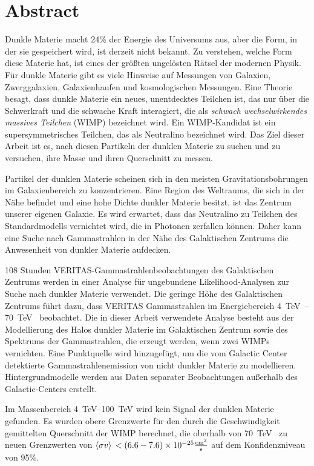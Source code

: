 \cleartooddpage[\thispagestyle{empty}]
\section*{Abstract}

Dunkle Materie macht 24\% der Energie des Universums aus, aber die Form, in der sie gespeichert wird, ist derzeit nicht bekannt.
Zu verstehen, welche Form diese Materie hat, ist eines der größten ungelösten Rätsel der modernen Physik.
Für dunkle Materie gibt es viele Hinweise auf Messungen von Galaxien, Zwerggalaxien, Galaxienhaufen und kosmologischen Messungen.
Eine Theorie besagt, dass dunkle Materie ein neues, unentdecktes Teilchen ist, das nur über die Schwerkraft und die schwache Kraft interagiert, die als \textit{schwach wechselwirkendes massives Teilchen} (WIMP) bezeichnet wird.
Ein WIMP-Kandidat ist ein supersymmetrisches Teilchen, das als Neutralino bezeichnet wird.
Das Ziel dieser Arbeit ist es, nach diesen Partikeln der dunklen Materie zu suchen und zu versuchen, ihre Masse und ihren Querschnitt zu messen.

Partikel der dunklen Materie scheinen sich in den meisten Gravitationsbohrungen im Galaxienbereich zu konzentrieren.
Eine Region des Weltraums, die sich in der Nähe befindet und eine hohe Dichte dunkler Materie besitzt, ist das Zentrum unserer eigenen Galaxie.
Es wird erwartet, dass das Neutralino zu Teilchen des Standardmodells vernichtet wird, die in Photonen zerfallen können.
Daher kann eine Suche nach Gammastrahlen in der Nähe des Galaktischen Zentrums die Anwesenheit von dunkler Materie aufdecken.

108 Stunden VERITAS-Gammastrahlenbeobachtungen des Galaktischen Zentrums werden in einer Analyse für ungebundene Likelihood-Analysen zur Suche nach dunkler Materie verwendet.
Die geringe Höhe des Galaktischen Zentrums führt dazu, dass VERITAS Gammastrahlen im Energiebereich \SIrange{4}{70}{\TeV{}} beobachtet.
Die in dieser Arbeit verwendete Analyse besteht aus der Modellierung des Halos dunkler Materie im Galaktischen Zentrum sowie des Spektrums der Gammastrahlen, die erzeugt werden, wenn zwei WIMPs vernichten.
Eine Punktquelle wird hinzugefügt, um die vom Galactic Center detektierte Gammastrahlenemission von nicht dunkler Materie zu modellieren.
Hintergrundmodelle werden aus Daten separater Beobachtungen außerhalb des Galactic-Centers erstellt.

Im Massenbereich \SIrange{4}{100}{\TeV} wird kein Signal der dunklen Materie gefunden.
Es wurden obere Grenzwerte für den durch die Geschwindigkeit gemittelten Querschnitt der WIMP berechnet, die oberhalb von \SI{70}{\TeV{}} zu neuen Grenzwerten von ${ \left \langle \sigma v \right \rangle{} < \left (6.6-7.6 \right ) \times 10^{-25} \frac{\mathrm{cm}^3}{\mathrm{s}} }$ auf dem Konfidenzniveau von 95\%.



\cleartoevenpage[\thispagestyle{plain}]
\null
